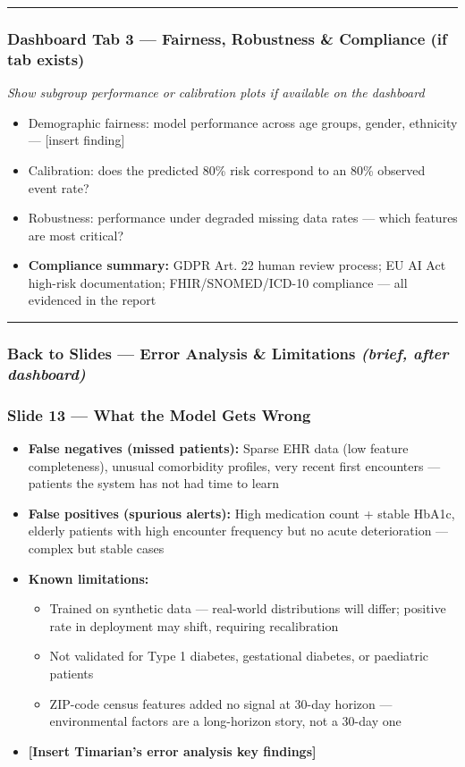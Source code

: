 \documentclass[11pt,a4paper]{article}
\begin{document}
\noindent\rule{\linewidth}{0.4pt}

\subsubsection{Dashboard Tab 3 --- Fairness, Robustness \& Compliance (if tab exists)}
\emph{Show subgroup performance or calibration plots if available on the dashboard}
\begin{itemize}
\item Demographic fairness: model performance across age groups, gender, ethnicity --- [insert finding]
\item Calibration: does the predicted 80\% risk correspond to an 80\% observed event rate?
\item Robustness: performance under degraded missing data rates --- which features are most critical?
\item \textbf{Compliance summary:} GDPR Art. 22 human review process; EU AI Act high-risk documentation; FHIR/SNOMED/ICD-10 compliance --- all evidenced in the report
\end{itemize}

\noindent\rule{\linewidth}{0.4pt}

\subsubsection{Back to Slides --- Error Analysis \& Limitations \emph{(brief, after dashboard)}}

\subsubsection{Slide 13 --- What the Model Gets Wrong}
\begin{itemize}
\item \textbf{False negatives (missed patients):} Sparse EHR data (low feature completeness), unusual comorbidity profiles, very recent first encounters --- patients the system has not had time to learn
\item \textbf{False positives (spurious alerts):} High medication count + stable HbA1c, elderly patients with high encounter frequency but no acute deterioration --- complex but stable cases
\item \textbf{Known limitations:}
\begin{itemize}
\item Trained on synthetic data --- real-world distributions will differ; positive rate in deployment may shift, requiring recalibration
\item Not validated for Type 1 diabetes, gestational diabetes, or paediatric patients
\item ZIP-code census features added no signal at 30-day horizon --- environmental factors are a long-horizon story, not a 30-day one
\end{itemize}
\item \textbf{[Insert Timarian's error analysis key findings]}
\end{itemize}
\end{document}
